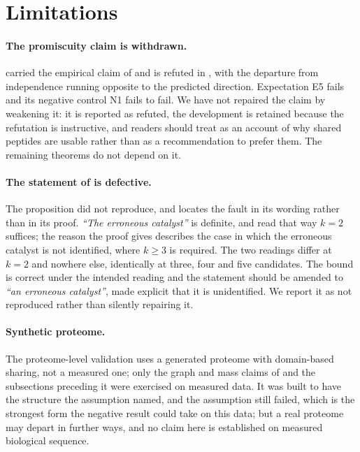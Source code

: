 \documentclass[11pt,a4paper]{article}
\theoremstyle{definition}
\theoremstyle{remark}
\begin{document}
\section{Limitations}
\label{sec:limitations}

\paragraph{The promiscuity claim is withdrawn.} 
carried the empirical claim of  and is refuted in
, with the departure from independence running
opposite to the predicted direction. Expectation E5 fails and its
negative control N1 fails to fail. We have not repaired the claim by
weakening it: it is reported as refuted, the development is retained
because the refutation is instructive, and readers should treat
 as an account of why shared peptides are usable
rather than as a recommendation to prefer them. The remaining theorems
do not depend on it.

\paragraph{The statement of  is defective.} The
proposition did not reproduce, and  locates the
fault in its wording rather than in its proof. \emph{``The erroneous
catalyst''} is definite, and read that way $k=2$ suffices; the reason
the proof gives describes the case in which the erroneous catalyst is
not identified, where $k\ge3$ is required. The two readings differ at
$k=2$ and nowhere else, identically at three, four and five candidates.
The bound is correct under the intended reading and the statement should
be amended to \emph{``an erroneous catalyst''}, made explicit that it is
unidentified. We report it as not reproduced rather than silently
repairing it.

\paragraph{Synthetic proteome.} The proteome-level validation uses a
generated proteome with domain-based sharing, not a measured one; only
the graph and mass claims of  and the
subsections preceding it were exercised on measured data. It was built to have the
structure the assumption named, and the assumption still failed, which
is the strongest form the negative result could take on this data; but a
real proteome may depart in further ways, and no claim here is
established on measured biological sequence.
\end{document}
